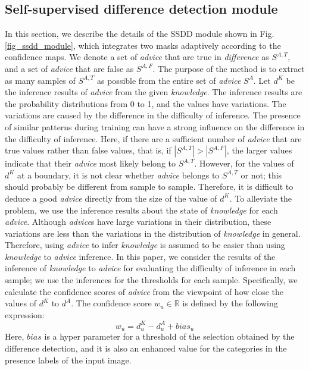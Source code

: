 \documentclass[10pt,twocolumn,letterpaper]{article}
\begin{document}
\subsection{Self-supervised difference detection module}
In this section, we describe the details of the SSDD module shown in Fig.\ref{fig_ssdd_module},
which integrates two masks adaptively according to the confidence maps.
We denote a set of {\it advice} that are true in {\it difference} as $ S^{A, T}$, and a set of {\it advice} that are false as $S^{A, F}$.
The purpose of the method is to extract as many samples of $ S^{A, T} $ as possible from the entire set of {\it advice} $ S^{A} $. 
Let $ d^{K} $ be the inference results of {\it advice} from the given {\it knowledge}.
The inference results are the probability distributions from 0 to 1, and the values have variations.
The variations are caused by the difference in the difficulty of inference.
The presence of similar patterns during training can have a strong influence on the difference in the difficulty of inference. 
Here, if there are a sufficient number of {\it advice} that are true values rather than false values, that is, if $|S^{A,T}|>|S^{A,F}|$, the larger values indicate that their {\it advice} most likely belong to $S^{A,T}$.
However, for the values of $d^{K}$ at a boundary, it is not clear whether {\it advice}  belongs to $ S^{A, T} $ or not; this should probably be different from sample to sample.
Therefore, it is difficult to deduce a good {\it advice} directly from the size of the value of $ d^{K} $.
To alleviate the problem, we use the inference results about the state of {\it knowledge} for each {\it advice}.
Although {\it advice}s have large variations in their distribution, these variations are less than the variations in the distribution of {\it knowledge} in general.
Therefore, using {\it advice} to infer {\it knowledge} is assumed to be easier than using {\it knowledge} to {\it advice} inference.
In this paper, we consider the results of the inference of {\it knowledge} to {\it advice} for evaluating the difficulty of inference in each sample; we use the inferences for the thresholds for each sample.
Specifically, we calculate the confidence scores of {\it advice}  from the viewpoint of how close the values of $ d^{K} $ to $ d^{A} $.
The confidence score $w_{u} \in {\mathbb R}$ is defined by the following expression:
\begin{equation}
w_{u}=d^{K}_{u}-d^{A}_{u}+bias_{u}
\label{eq_w}
\end{equation}
Here, $bias$ is a hyper parameter for a threshold of the selection obtained by the difference detection, and it is also an enhanced value for the categories in the presence labels of the input image.
\end{document}
